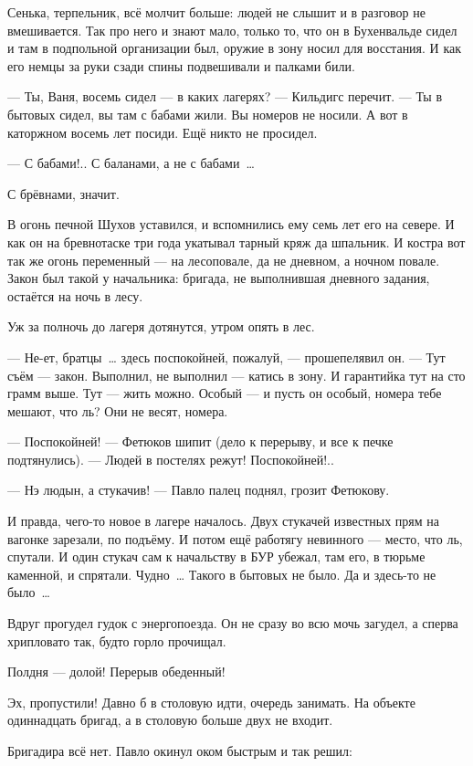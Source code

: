 Сенька, терпельник, всё молчит больше: людей не слышит и в разговор не вмешивается. Так про него и знают мало, только то, что он в Бухенвальде сидел и там в подпольной организации был, оружие в зону носил для восстания. И как его немцы за руки сзади спины подвешивали и палками били.

--- Ты, Ваня, восемь сидел --- в каких лагерях? --- Кильдигс перечит. --- Ты в бытовых сидел, вы там с бабами жили. Вы номеров не носили. А вот в каторжном восемь лет посиди. Ещё никто не просидел.

--- С бабами!.. С баланами, а не с бабами~\dots{}

С брёвнами, значит.

В огонь печной Шухов уставился, и вспомнились ему семь лет его на севере. И как он на бревнотаске три года укатывал тарный кряж да шпальник. И костра вот так же огонь переменный --- на лесоповале, да не дневном, а ночном повале. Закон был такой у начальника: бригада, не выполнившая дневного задания, остаётся на ночь в лесу.

Уж за полночь до лагеря дотянутся, утром опять в лес.

--- Не-ет, братцы~\dots{} здесь поспокойней, пожалуй, --- прошепелявил он. --- Тут съём --- закон. Выполнил, не выполнил --- катись в зону. И гарантийка тут на сто грамм выше. Тут --- жить можно. Особый --- и пусть он особый, номера тебе мешают, что ль? Они не весят, номера.

--- Поспокойней! --- Фетюков шипит (дело к перерыву, и все к печке подтянулись). --- Людей в постелях режут! Поспокойней!..

--- Нэ людын, а стукачив! --- Павло палец поднял, грозит Фетюкову.

И правда, чего-то новое в лагере началось. Двух стукачей известных прям на вагонке зарезали, по подъёму. И потом ещё работягу невинного --- место, что ль, спутали. И один стукач сам к начальству в БУР убежал, там его, в тюрьме каменной, и спрятали. Чудно~\dots{} Такого в бытовых не было. Да и здесь-то не было~\dots{}

Вдруг прогудел гудок с энергопоезда. Он не сразу во всю мочь загудел, а сперва хрипловато так, будто горло прочищал.

Полдня --- долой! Перерыв обеденный!

Эх, пропустили! Давно б в столовую идти, очередь занимать. На объекте одиннадцать бригад, а в столовую больше двух не входит.

Бригадира всё нет. Павло окинул оком быстрым и так решил:

